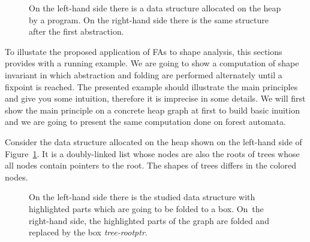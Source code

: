 { %
\begin{figure}[bt]
\begin{center}
\scalebox{.7} {
  \begin{subfigure}[b]{0.49\linewidth}
  \end{subfigure}
  \begin{subfigure}[b]{0.49\linewidth}
  \end{subfigure}
}
\end{center}
\caption{On the left-hand side there is a data structure allocated on the heap by a program. On the right-hand side there is the same structure after the first abstraction.}
\label{ref:fig-re1}
\end{figure}

To illustate the proposed application of FAs to shape analysis, this sections provides with a running example.
We are going to show a computation of shape invariant in which
abstraction and folding are performed alternately until a fixpoint is reached.
The presented example should illustrate the main principles and give you some intuition,
therefore it is imprecise in some details.
We will first show the main principle on a concrete heap graph at first to build basic inuition
and we are going to present the same computation done on forest automata.

Consider the data structure allocated on the heap shown on the left-hand side of
Figure~\ref{ref:fig-re1}.
It is a doubly-linked list whose nodes are also the roots of trees whose all nodes contain pointers to the root.
The shapes of trees differs in the colored nodes.

\begin{figure}[bt]
\begin{center}
\scalebox{.7} {
  \begin{subfigure}[b]{0.49\linewidth}
  \end{subfigure}
  \begin{subfigure}[b]{0.49\linewidth}
  \end{subfigure}
}
\end{center}
\caption{On the left-hand side there is the studied data structure with highlighted parts which are going to be folded to a box. On~the right-hand side,
the highlighted parts of the graph are folded and replaced by the box \emph{tree-rootptr}.}
\label{ref:fig-re2}
\end{figure}

}
